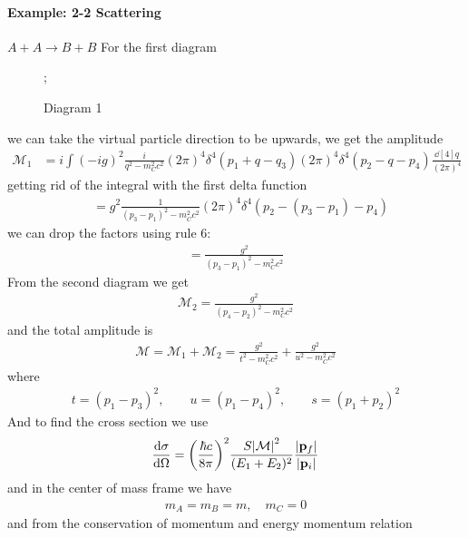 \documentclass[../main.tex]{subfiles}
\begin{document}
\paragraph*{Example: 2-2 Scattering} $A + A \to B + B$
For the first diagram 
\begin{figure}[ht]
    \centering
    ;
    \caption{Diagram 1}
\end{figure}
we can take the virtual particle direction to be upwards, we get the amplitude
\begin{align*}
    \mathcal{M}_1 &= i \int (-ig)^2 \frac{i}{q^2 - m_C^2 c^2} (2\pi)^4 \delta^4(p_1 + q - q_3)
    (2\pi)^4 \delta^4(p_2 - q - p_4) \frac{\dd[4]{q}}{(2\pi)^4}
\end{align*}
getting rid of the integral with the first delta function
\begin{align*}
    &= g^2 \frac{1}{(p_3 - p_1)^2 - m_C^2 c^2} (2\pi)^4 \delta^4(p_2 - (p_3 - p_1) - p_4)
\end{align*}
we can drop the factors using rule 6:
\begin{align*}
    = \frac{g^2}{(p_3 - p_1)^2 - m_C^2 c^2}
\end{align*}
From the second diagram we get
\begin{align*}
    \mathcal{M}_2 = \frac{g^2}{(p_4 - p_2)^2 - m_C^2 c^2}
\end{align*}
and the total amplitude is
\begin{align*}
    \mathcal{M} = \mathcal{M}_1 + \mathcal{M}_2 = \frac{g^2}{t^2 - m_C^2 c^2} + \frac{g^2}{u^2 - m_C^2 c^2}
\end{align*}
where
\begin{align*}
    t = (p_1 - p_3)^2,\qquad u = (p_1 - p_4)^2, \qquad s = (p_1 + p_2)^2
\end{align*}
And to find the cross section we use 
\begin{align*}
    \dv{\sigma}{\Omega} = \qt(\frac{\hbar c}{8\pi})^2 \frac{S \abs{\mathcal{M}}^2}{(E_1 + E_2)^2} \frac{\abs{\vb p_f}}{\abs{\vb p_i}}
\end{align*}
and in the center of mass frame we have
\begin{align*}
    m_A = m_B = m, \quad m_C = 0
\end{align*}
and from the conservation of momentum and energy momentum relation
\end{document}
